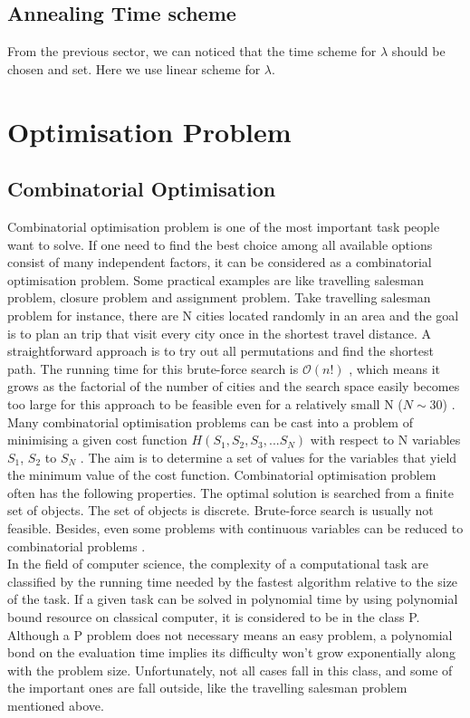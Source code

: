 \documentclass[twoside,a4paper,article]{combine}
\begin{document}
\subsection{Annealing Time scheme}
From the previous sector, we can noticed that the time scheme for $\lambda$ should be chosen and set. Here we use linear scheme for $\lambda$.


\section{Optimisation Problem}
\subsection{Combinatorial Optimisation}

Combinatorial optimisation problem is one of the most important task people want to solve. If one need to find the best choice among all available options consist of many independent factors, it can be considered as a combinatorial optimisation problem. Some practical examples are like travelling salesman problem, closure problem and assignment problem. Take travelling salesman problem for instance, there are N cities located randomly in an area and the goal is to plan an trip that visit every city once in the shortest travel distance. A straightforward approach is to try out all permutations and find the shortest path. The running time for this brute-force search is $\mathcal{O}(n!)$ , which means it grows as the factorial of the number of cities and the search space easily becomes too large for this approach to be feasible even for a relatively small N ($N \sim 30$) \cite{Santoro2006}. \\

Many combinatorial optimisation problems can be cast into a problem of minimising a given cost function $H(S_1,S_2,S_3,...S_N)$ with respect to N variables $S_1$, $S_2$ to $S_N$ \cite{Das2008}. The aim is to determine a set of values for the variables that yield the minimum value of the cost function. Combinatorial optimisation problem often has the following properties. The optimal solution is searched from a finite set of objects. The set of objects is discrete. Brute-force search is usually not feasible. Besides, even some problems with continuous variables can be reduced to combinatorial problems \cite{Papadimitriou1984}. \\

In the field of computer science, the complexity of a computational task are classified by the running time needed by the fastest algorithm relative to the size of the task. If a given task can be solved in polynomial time by using polynomial bound resource on classical computer, it is considered to be in the class P. Although a P problem does not necessary means an easy problem, a polynomial bond on the evaluation time implies its difficulty won't grow exponentially along with the problem size. Unfortunately, not all cases fall in this class, and some of the important ones are fall outside, like the travelling salesman problem mentioned above.\\
\end{document}
